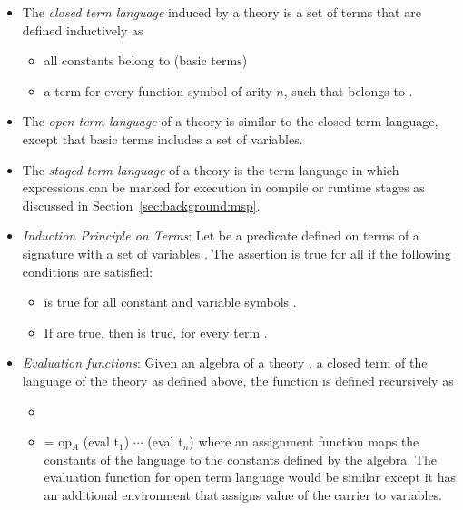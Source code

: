 \begin{itemize}
   \item The \emph{closed term language}  induced by a theory is a set of terms that are defined inductively as 
    \begin{itemize}
        \item all constants belong to  (basic terms) 
        \item a term  for every function symbol  of arity $n$, such that   belongs to . 
    \end{itemize}
    \item The \emph{open term language} of a theory is similar to the closed term language, except that basic terms includes a set of variables.  
    \item The \emph{staged term language} of a theory is the term language in which expressions can be marked for execution in compile or runtime stages as discussed in Section~\ref{sec:background:msp}.  
    \item \emph{Induction Principle on Terms}: Let  be a predicate defined on terms  of a signature  with a set of variables . The assertion  is true for all  if the following conditions are satisfied: 
    \begin{itemize}
        \item {} is true for all constant and variable symbols .
        \item If  are true, then  is true, for every term .  
    \end{itemize}     
    \item \emph{Evaluation functions}: Given an algebra  of a theory \lstmath{$\Gamma = (\sort,\fsyms,\equations$)}, a closed term of the language of the theory as defined above, the function  is defined recursively as 
    \begin{itemize}
        \item {}
        \item {} = op$_A$ (eval t$_1$) $\cdots$ (eval t$_n$) where an assignment function maps the constants of the language to the constants defined by the algebra. The evaluation function for open term language would be similar except it has an additional environment that assigns value of the carrier to variables. 

\end{itemize}
\end{itemize}
